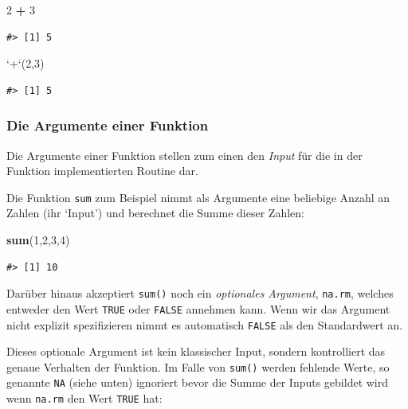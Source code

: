 \documentclass[]{book}
\newenvironment{Shaded}{\begin{snugshade}}{\end{snugshade}}
\newcommand{\KeywordTok}[1]{\textcolor[rgb]{0.13,0.29,0.53}{\textbf{#1}}}
\newcommand{\DataTypeTok}[1]{\textcolor[rgb]{0.13,0.29,0.53}{#1}}
\newcommand{\DecValTok}[1]{\textcolor[rgb]{0.00,0.00,0.81}{#1}}
\newcommand{\StringTok}[1]{\textcolor[rgb]{0.31,0.60,0.02}{#1}}
\newcommand{\OperatorTok}[1]{\textcolor[rgb]{0.81,0.36,0.00}{\textbf{#1}}}
\newcommand{\NormalTok}[1]{#1}
\begin{document}
\begin{Shaded}
\begin{Highlighting}[]
\DecValTok{2} \OperatorTok{+}\StringTok{ }\DecValTok{3}
\end{Highlighting}
\end{Shaded}

\begin{verbatim}
#> [1] 5
\end{verbatim}

\begin{Shaded}
\begin{Highlighting}[]
\StringTok{`}\DataTypeTok{+}\StringTok{`}\NormalTok{(}\DecValTok{2}\NormalTok{,}\DecValTok{3}\NormalTok{)}
\end{Highlighting}
\end{Shaded}

\begin{verbatim}
#> [1] 5
\end{verbatim}

\subsubsection{Die Argumente einer
Funktion}\label{die-argumente-einer-funktion}

Die Argumente einer Funktion stellen zum einen den \emph{Input} für die
in der Funktion implementierten Routine dar.

Die Funktion \texttt{sum} zum Beispiel nimmt als Argumente eine
beliebige Anzahl an Zahlen (ihr `Input') und berechnet die Summe dieser
Zahlen:

\begin{Shaded}
\begin{Highlighting}[]
\KeywordTok{sum}\NormalTok{(}\DecValTok{1}\NormalTok{,}\DecValTok{2}\NormalTok{,}\DecValTok{3}\NormalTok{,}\DecValTok{4}\NormalTok{)}
\end{Highlighting}
\end{Shaded}

\begin{verbatim}
#> [1] 10
\end{verbatim}

Darüber hinaus akzeptiert \texttt{sum()} noch ein \emph{optionales
Argument}, \texttt{na.rm}, welches entweder den Wert \texttt{TRUE} oder
\texttt{FALSE} annehmen kann. Wenn wir das Argument nicht explizit
spezifizieren nimmt es automatisch \texttt{FALSE} als den Standardwert
an.

Dieses optionale Argument ist kein klassischer Input, sondern
kontrolliert das genaue Verhalten der Funktion. Im Falle von
\texttt{sum()} werden fehlende Werte, so genannte \texttt{NA} (siehe
unten) ignoriert bevor die Summe der Inputs gebildet wird wenn
\texttt{na.rm} den Wert \texttt{TRUE} hat:
\end{document}
